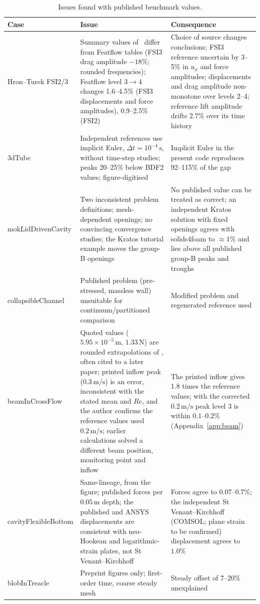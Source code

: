 \begin{table}[htbp]
	\centering
	\footnotesize
	\setlength{\tabcolsep}{3pt}
	\caption{Issues found with published benchmark values.}
	\label{tab:published}
	\begin{tabular}{p{2.8cm}p{5.8cm}p{5.0cm}}
		\toprule
		Case & Issue & Consequence \\
		\midrule
		Hron--Turek FSI2/3 & Summary values of~\citet{Turek2006} differ from Featflow tables (FSI3 drag amplitude $-18\%$; rounded frequencies); Featflow level 3$\to$4 changes 1.6--4.5\% (FSI3 displacements and force amplitudes), 0.9--2.5\% (FSI2) & Choice of source changes conclusions; FSI3 reference uncertain by 3--5\% in $u_x$ and force amplitudes; displacements and drag amplitude non-monotone over levels 2--4; reference lift amplitude drifts $2.7\%$ over its time history \\
		3dTube & Independent references use implicit Euler, $\Delta t = 10^{-4}\,\mathrm{s}$, without time-step studies; peaks 20--25\% below BDF2 values; figure-digitised & Implicit Euler in the present code reproduces 92--115\% of the gap \\
		mokLidDrivenCavity & Two inconsistent problem definitions; mesh-dependent openings; no convincing convergence studies; the Kratos tutorial example moves the group-B openings & No published value can be treated as correct; an independent Kratos solution with fixed openings agrees with solids4foam to $\approx1\%$ and lies above all published group-B peaks and troughs \\
		collapsibleChannel & Published problem (pre-stressed, massless wall) unsuitable for continuum/partitioned comparison & Modified problem and regenerated reference used \\
		beamInCrossFlow & Quoted values ($5.95\times10^{-5}\,\mathrm{m}$, $1.33\,\mathrm{N}$) are rounded extrapolations of \citet{Richter2012}, often cited to a later paper; printed inflow peak ($0.3\,\mathrm{m/s}$) is an error, inconsistent with the stated mean and $Re$, and the author confirms the reference values used $0.2\,\mathrm{m/s}$; earlier calculations solved a different beam position, monitoring point and inflow & The printed inflow gives $1.8$ times the reference values; with the corrected $0.2\,\mathrm{m/s}$ peak level 3 is within $0.1$--$0.2\%$ (Appendix~\ref{app:beam}) \\
		cavityFlexibleBottom & Same-lineage, from the figure; published forces per $0.05\,\mathrm{m}$ depth; the published and ANSYS displacements are consistent with neo-Hookean and logarithmic-strain plates, not St Venant--Kirchhoff & Forces agree to $0.07$--$0.7\%$; the independent St Venant--Kirchhoff (COMSOL; plane strain to be confirmed) displacement agrees to $1.0\%$ \\
		blobInTreacle & Preprint figures only; first-order time, coarse steady mesh & Steady offset of 7--20\% unexplained \\
		\bottomrule
	\end{tabular}
\end{table}

